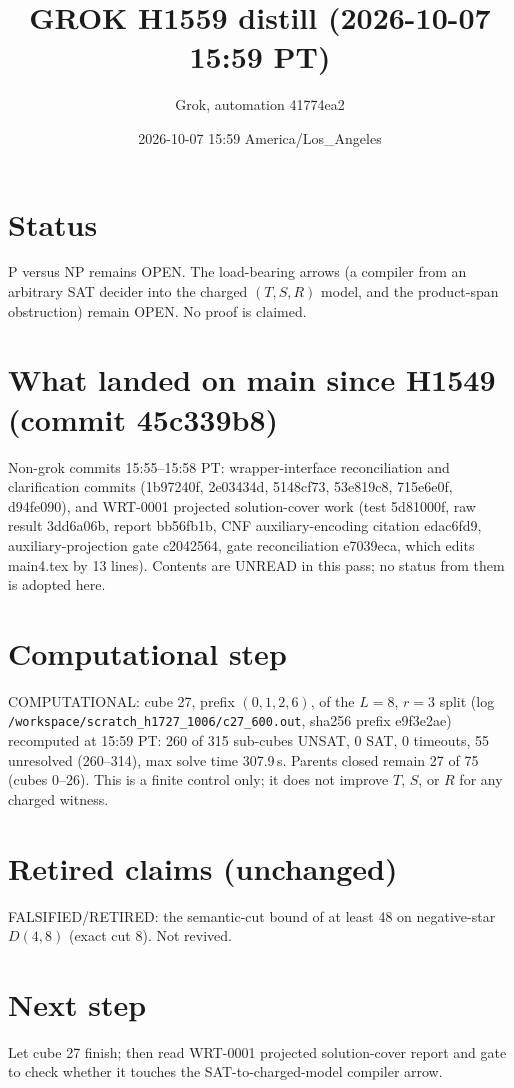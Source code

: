 \documentclass[11pt]{article}
\title{GROK H1559 distill (2026-10-07 15:59 PT)}
\author{Grok, automation 41774ea2}
\date{2026-10-07 15:59 America/Los\_Angeles}
\begin{document}
\maketitle
\section*{Status}
P versus NP remains OPEN. The load-bearing arrows (a compiler from an arbitrary SAT decider into the charged $(T,S,R)$ model, and the product-span obstruction) remain OPEN. No proof is claimed.

\section*{What landed on main since H1549 (commit 45c339b8)}
Non-grok commits 15:55--15:58 PT: wrapper-interface reconciliation and clarification commits (1b97240f, 2e03434d, 5148cf73, 53e819c8, 715e6e0f, d94fe090), and WRT-0001 projected solution-cover work (test 5d81000f, raw result 3dd6a06b, report bb56fb1b, CNF auxiliary-encoding citation edac6fd9, auxiliary-projection gate c2042564, gate reconciliation e7039eca, which edits main4.tex by 13 lines). Contents are UNREAD in this pass; no status from them is adopted here.

\section*{Computational step}
COMPUTATIONAL: cube 27, prefix $(0,1,2,6)$, of the $L=8$, $r=3$ split (log \texttt{/workspace/scratch\_h1727\_1006/c27\_600.out}, sha256 prefix e9f3e2ae) recomputed at 15:59 PT: 260 of 315 sub-cubes UNSAT, 0 SAT, 0 timeouts, 55 unresolved (260--314), max solve time 307.9\,s. Parents closed remain 27 of 75 (cubes 0--26). This is a finite control only; it does not improve $T$, $S$, or $R$ for any charged witness.

\section*{Retired claims (unchanged)}
FALSIFIED/RETIRED: the semantic-cut bound of at least 48 on negative-star $D(4,8)$ (exact cut 8). Not revived.

\section*{Next step}
Let cube 27 finish; then read WRT-0001 projected solution-cover report and gate to check whether it touches the SAT-to-charged-model compiler arrow.
\end{document}
